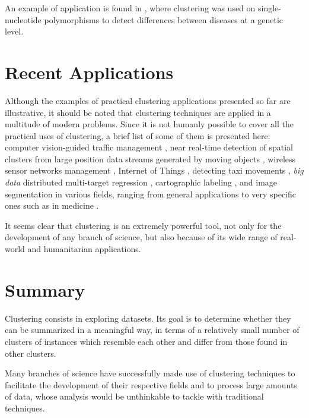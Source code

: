 An example of application is found in \cite{selinski2008cluster}, where clustering was used on single-nucleotide polymorphisms to detect differences between diseases at a genetic level.

\section{Recent Applications}

Although the examples of practical clustering applications presented so far are illustrative, it should be noted that clustering techniques are applied in a multitude of modern problems. Since it is not humanly possible to cover all the practical uses of clustering, a brief list of some of them is presented here: computer vision-guided traffic management \cite{kumaran2019computer}, near real-time detection of spatial clusters from large position data streams generated by moving objects \cite{junior2019dg2cep}, wireless sensor networks management \cite{wan2019similarity}, Internet of Things \cite{aranzazu2019anchor}, detecting taxi movements \cite{ibrahim2019detecting}, \textit{big data} distributed multi-target regression \cite{corizzo2019dencast},  cartographic labeling \cite{araujo2019improving}, and image segmentation in various fields, ranging from general applications \cite{wang2018non} to very specific ones such as in medicine \cite{verma2016improved, aparajeeta2016modified}. 

It seems clear that clustering is an extremely powerful tool, not only for the development of any branch of science, but also because of its wide range of real-world and humanitarian applications.

\section{Summary}

Clustering consists in exploring datasets. Its goal is to determine whether they can be summarized in a meaningful way, in terms of a relatively small number of clusters of instances which resemble each other and differ from those found in other clusters.

Many branches of science have successfully made use of clustering techniques to facilitate the development of their respective fields and to process large amounts of data, whose analysis would be unthinkable to tackle with traditional techniques.
